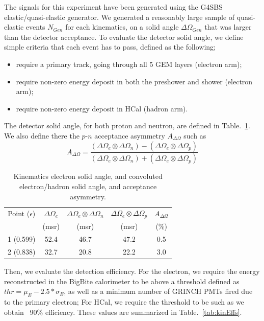 The signals for this experiment have been generated using the G4SBS elastic/quasi-elastic generator. 
We generated a reasonably large sample of quasi-elastic events $N_{Gen}$ for each kinematics, on a solid angle $\Delta\Omega_{Gen}$ that was larger than the detector acceptance.
To evaluate the detector solid angle, we define simple criteria that each event has to pass, defined as the following;
%
\begin{itemize}
\item{require a primary track, going through all 5 GEM layers (electron arm);}
\item{require non-zero energy deposit in both the preshower and shower (electron arm);}
\item{require non-zero energy deposit in HCal (hadron arm).}
\end{itemize}
%
The detector solid angle, for both proton and neutron, are defined in Table.~\ref{tab:kinExpParams}.
We also define there the $p$-$n$ acceptance asymmetry $A_{\Delta\Omega}$ such as
%
\begin{equation}
  A_{\Delta\Omega} = \frac{(\Delta\Omega_e \otimes \Delta\Omega_n)-(\Delta\Omega_e \otimes \Delta\Omega_p)}{(\Delta\Omega_e \otimes \Delta\Omega_n)+(\Delta\Omega_e \otimes \Delta\Omega_p)}
\end{equation}
\begin{center}
\begin{table}[h]
\begin{tabular}{|c|c|c|c|c|}
\hline
Point ($\epsilon$) & $\Delta\Omega_e$ & $\Delta\Omega_e \otimes \Delta\Omega_n$ & $\Delta\Omega_e \otimes \Delta\Omega_p$ & $A_{\Delta\Omega}$ \\
 & (msr) & (msr) & (msr) & (\%) \\
\hline
1 (0.599) & 52.4 & 46.7 & 47.2 & 0.5 \\
\hline
2 (0.838) & 32.7 & 20.8 & 22.2 & 3.0 \\
\hline
\end{tabular} 
\caption{Kinematics electron solid angle, and convoluted electron/hadron solid angle, and acceptance asymmetry.}
\label{tab:kinExpParams}
\end{table}
\end{center}
%
Then, we evaluate the detection efficiency. For the electron, we require the energy reconstructed in the BigBite calorimeter to be above a threshold defined as $thr = \mu_E- 2.5* \sigma_E$, as well as a minimum number of GRINCH PMTs fired due to the primary electron; For HCal, we require the threshold to be such as we obtain ~90\% efficiency. These values are summarized in Table.~\ref{tab:kinEffs}.
